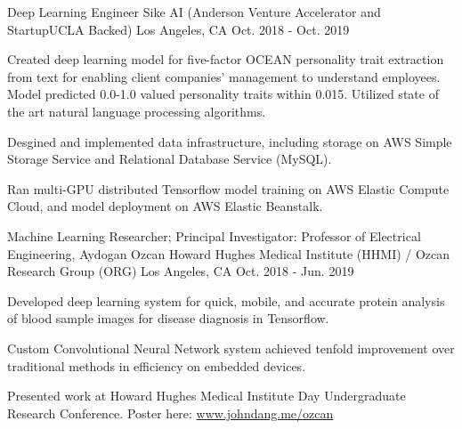 \begin{cventries}
  \cventry
    {Deep Learning Engineer} %
    {Sike AI (Anderson Venture Accelerator and StartupUCLA Backed)} %
    {Los Angeles, CA} %
    {Oct. 2018 - Oct. 2019} %
    {
      \begin{cvitems} %
        \item {Created deep learning model for five-factor OCEAN personality trait extraction from text for enabling 
        client companies' management to understand employees. Model predicted 0.0-1.0 valued personality traits within 0.015.
        Utilized state of the art natural language processing algorithms.}
        \item {Desgined and implemented data infrastructure, including storage on AWS Simple Storage Service
         and Relational Database Service (MySQL).
        \item Ran multi-GPU distributed Tensorflow model training on AWS Elastic Compute Cloud, and model deployment on AWS Elastic Beanstalk.}
      \end{cvitems}
    }

  \cventry
    {Machine Learning Researcher; Principal Investigator: Professor of Electrical Engineering, Aydogan Ozcan} %
    {Howard Hughes Medical Institute (HHMI) / Ozcan Research Group (ORG)} %
    {Los Angeles, CA} %
    {Oct. 2018 - Jun. 2019} %
    {
      \begin{cvitems} %
        \item {Developed deep learning system for quick, mobile, and accurate protein analysis of blood sample images for disease diagnosis in Tensorflow.}
        \item {Custom Convolutional Neural Network system achieved tenfold improvement over traditional methods in efficiency on embedded devices.}
        \item Presented work at Howard Hughes Medical Institute Day Undergraduate Research Conference. Poster here: \href{https://www.johndang.me/ozcan}{www.johndang.me/ozcan}
      \end{cvitems}
    }


\end{cventries}
